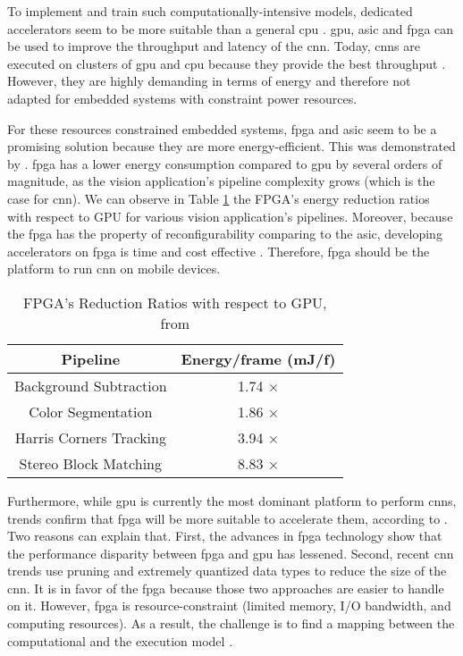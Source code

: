 To implement and train such computationally-intensive models, dedicated accelerators seem to be more suitable than a general \acrfull{cpu} \cite{liu_fpga-based_2019}. \acrfull{gpu}, \acrfull{asic} and \acrfull{fpga} can be used to improve the throughput and latency of the \acrshort{cnn}. Today, \acrshort{cnn}s are executed on clusters of \acrshort{gpu} and \acrshort{cpu} because they provide the best throughput \cite{liu_uniform_2019}. However, they are highly demanding in terms of energy and therefore not adapted for embedded systems with constraint power resources.

For these resources constrained embedded systems, \acrshort{fpga} and \acrshort{asic} seem to be a promising solution because they are more energy-efficient. This was demonstrated by \textcite{qasaimeh_comparing_2019}. \acrshort{fpga} has a lower energy consumption compared to \acrshort{gpu} by several orders of magnitude, as the vision application’s pipeline complexity grows (which is the case for \acrshort{cnn}). We can observe in Table \ref{tab:benchener} the FPGA’s energy reduction ratios with respect to GPU for various vision application’s pipelines. Moreover, because the \acrshort{fpga} has the property of reconfigurability comparing to the \acrshort{asic}, developing accelerators on \acrshort{fpga} is time and cost effective \cite{motamedi_placid_2017}. Therefore, \acrshort{fpga} should be the platform to run \acrshort{cnn} on mobile devices.
%
\begin{table}[H]
    \center
    \begin{tabular}{|c|c|}
        \hline
        Pipeline & Energy/frame (mJ/f) \\
        \hline
        Background Subtraction & 1.74 $\times$\\
        \hline
        Color Segmentation & 1.86 $\times$ \\
        \hline
        Harris Corners Tracking & 3.94 $\times$ \\
        \hline
        Stereo Block Matching & 8.83 $\times$ \\
        \hline
    \end{tabular}
    \caption{FPGA’s Reduction Ratios with respect to GPU, from \cite{qasaimeh_comparing_2019}}
    \label{tab:benchener}
\end{table}

Furthermore, while \acrshort{gpu} is currently the most dominant platform to perform \acrshort{cnn}s, trends confirm that \acrshort{fpga} will be more suitable to accelerate them, according to \textcite{nurvitadhi_can_2017}. Two reasons can explain that. First, the advances in \acrshort{fpga} technology show that the performance disparity between \acrshort{fpga} and \acrshort{gpu} has lessened. Second, recent \acrshort{cnn} trends use pruning and extremely quantized data types to reduce the size of the \acrshort{cnn}. It is in favor of the \acrshort{fpga} because those two approaches are easier to handle on it. However, \acrshort{fpga} is resource-constraint (limited memory, I/O bandwidth, and computing resources). As a result, the challenge is to find a mapping between the computational and the execution model \cite{morcel_feathernet_2019}.

